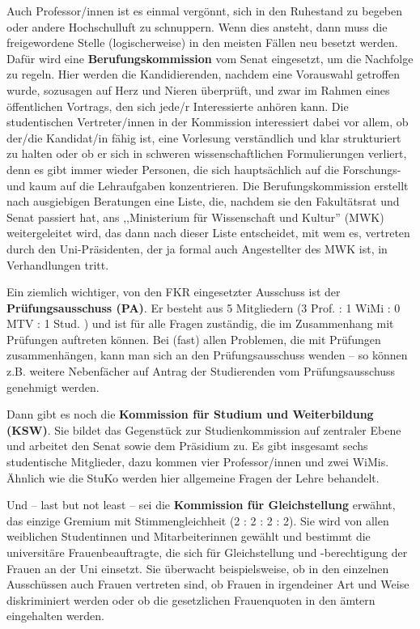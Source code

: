 Auch Professor/innen ist es einmal vergönnt, sich in den Ruhestand zu begeben oder 
andere Hochschulluft zu schnuppern. Wenn dies ansteht, dann muss die 
freigewordene Stelle (logischerweise) in den meisten Fällen neu besetzt 
werden. Dafür wird eine \textbf{Berufungskommission} vom Senat eingesetzt, um 
die Nachfolge zu regeln. Hier werden die Kandidierenden, nachdem eine Vorauswahl 
getroffen wurde, sozusagen auf Herz und Nieren überprüft, und zwar im Rahmen 
eines öffentlichen Vortrags, den sich jede/r Interessierte anhören kann. Die 
 studentischen Vertreter/innen in der Kommission interessiert dabei vor allem, ob 
der/die Kandidat/in fähig ist, eine Vorlesung verständlich und klar 
strukturiert zu halten oder ob er sich in schweren wissenschaftlichen 
Formulierungen verliert, denn es gibt immer wieder Personen, die sich
hauptsächlich auf die Forschungs- und kaum auf die Lehraufgaben konzentrieren.
Die Berufungskommission 
erstellt nach ausgiebigen Beratungen eine Liste, die, nachdem sie den Fakultätsrat und Senat 
passiert hat, ans ,,Ministerium für 
Wissenschaft und Kultur'' (MWK) weitergeleitet wird, das dann nach dieser 
Liste entscheidet, mit wem es, vertreten durch den Uni-Präsidenten, der ja 
formal auch Angestellter des MWK ist, in Verhandlungen tritt.

Ein ziemlich wichtiger, von den FKR eingesetzter Ausschuss ist der 
\textbf{Prüfungsausschuss (PA)}. Er besteht aus 5 Mitgliedern (3 Prof. : 1 WiMi : 0 MTV : 
1 Stud. ) und ist für alle Fragen zuständig, die im Zusammenhang mit Prüfungen
auftreten können. Bei (fast) allen Problemen, die mit Prüfungen 
zusammenhängen, kann
man sich an den Prüfungsausschuss wenden -- so können z.B. weitere
Nebenfächer auf Antrag der Studierenden vom Prüfungsausschuss genehmigt
werden.

Dann gibt es noch die \textbf{Kommission für Studium und Weiterbildung (KSW)}. 
Sie bildet das Gegenstück zur Studienkommission auf zentraler Ebene und arbeitet den Senat sowie dem 
Präsidium zu. Es gibt insgesamt sechs studentische Mitglieder, dazu kommen vier Professor/innen und zwei WiMis. 
Ähnlich wie die StuKo werden hier allgemeine Fragen der Lehre behandelt.

Und -- last but not least -- sei die \textbf{Kommission für Gleichstellung} 
erwähnt, das einzige Gremium mit Stimmengleichheit (2 : 2 : 2 : 2). Sie wird von allen 
weiblichen Studentinnen und Mitarbeiterinnen gewählt und bestimmt 
 die universitäre Frauenbeauftragte, die sich für Gleichstellung und 
-berechtigung der Frauen an der Uni einsetzt. Sie überwacht beispielsweise, ob 
in den einzelnen Ausschüssen auch Frauen vertreten sind, ob Frauen in 
irgendeiner Art und Weise diskriminiert werden oder ob die gesetzlichen 
Frauenquoten in den ämtern eingehalten werden. 

